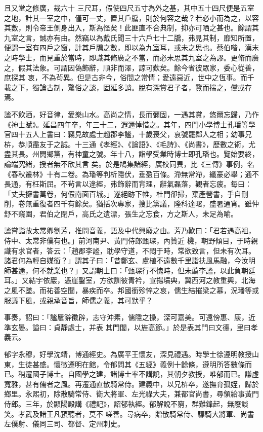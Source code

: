 \begin{pinyinscope}
 且又堂之修廣，裁六十
 三尺耳，假使四尺五寸為外之基，其中五十四尺便是五室之地，計其一室之中，僅可一丈，置其戶牖，則於何容之哉？若必小而為之，以容其數，則令帝王側身出入，斯為怪矣！此匪直不合典制，抑亦可哂之甚也。餘謂其九室之言，誠亦有由。然竊以為戴氏聞三十六戶七十二牖，弗見其制，靡知所置，便謂一室有四戶之窗，計其戶牖之數，即以為九室耳，或未之思也。蔡伯喈，漢末之時學士，而見重於當時，即識其脩廣之不當，而必未思其九室之為謬。更脩而廣之，假其法象。可謂因偽飾辭，順非而澤，諒可歎矣。餘今省彼眾家，委心從善，庶探其
 衷，不為茍異。但是古非今，俗間之常情；愛遠惡近，世中之恆事。而千載之下，獨論古制，驚俗之談，固延多誚。脫有深賞君子者，覽而揣之，儻或存焉。



 謐不飲酒，好音律，愛樂山水。高尚之情，長而彌固，一遇其賞，悠爾忘歸，乃作《神士賦》。延昌四年卒，年三十二，遐邇悼惜之。其年，四門小學博士孔璠等學官四十五人上書曰：竊見故處士趙郡李謐，十歲喪父，哀號罷鄰人之相；幼事兄枿，恭順盡友于之誠。十三通《孝經》、《論語》、《毛詩》、《尚書》，歷數之術，尤盡其長。州閭鄉黨，有神童之號。年十八，詣學受業時博士即孔璠也。覽始要終，論端究緒，授者無不欣其言
 矣。於是鳩集諸經，廣校同異，比《三傳》事例，名《春秋叢林》十有二卷。為璠等判析隱伏，垂盈百條。滯無常滯，纖豪必舉；通不長通，有枉斯屈。不茍言以違經，弗飾辭而背理，辭氣磊落，觀者忘疲。每曰：「丈夫擁書萬卷，何假南面百城。」遂絕跡下帷，杜門卻掃，棄產營書，手自刪削，卷無重復者四千有餘矣。猶括次專家，搜比黨議，隆科達曙，盛暑通宵。雖仲舒不窺園，君伯之閉戶，高氏之遺漂，張生之忘食，方之斯人，未足為喻。



 謐嘗詣故太常卿劉芳，推問音義，語及中代興廢之由。芳乃歎曰：「君若遇高祖，侍中、太常非僕有也。」前河南尹、黃門侍郎甄琛，內贊近
 機，朝野傾目，于時親識有求官者，答云：「趙郡李謐，耽學守道，不悶于時，常欲致言，但未有次耳。諸君何為輕自媒衒？」謂其子曰：「昔鄭玄、盧植不遠數千里詣扶風馬融，今汝明師甚邇，何不就業也？」又謂朝士曰：「甄琛行不愧時，但未薦李謐，以此負朝廷耳。」又結宇依巖，憑崖鑿室，方欲訓彼青衿，宣揚墳典，冀西河之教重興，北海之風不墜。而祐善空聞，暴疾而卒。邦國銜殄悴之哀，儒生結摧梁之慕，況璠等或服議下風，或親承音旨，師儒之義，其可默乎？



 事奏，詔曰：「謐屢辭徵辟，志守沖素，儒隱之操，深可嘉美。可遠傍惠、康，近準玄晏。謚曰：貞靜處士，并表
 其門閭，以旌高節。」於是表其門曰文德，里曰孝義云。



 郁字永穆，好學沈靖，博通經史。為廣平王懷友，深見禮遇。時學士徐遵明教授山東，生徒甚盛。懷徵遵明在館，令郁問其《五經》義例十餘條，遵明所答數條而已。稍遷國子博士。自國學之建，諸博士率不講說，其朝夕教授，唯郁而已。謙虛寬雅，甚有儒者之風。再遷通直散騎常侍。建義中，以兄枿卒，遂撫育孤姪，歸於鄉里。永熙初，除散騎常侍、衛大將軍、左光祿大夫，兼都官尚書，尋領給事黃門侍郎。三年，於顯陽殿講《禮記》，詔郁執經。郁解說不窮，群難鋒起，無廢談笑。孝武及諸王凡預聽者，莫不
 嗟善。尋病卒，贈散騎常侍、驃騎大將軍、尚書左僕射、儀同三司、都督、定州刺史。




\end{pinyinscope}
